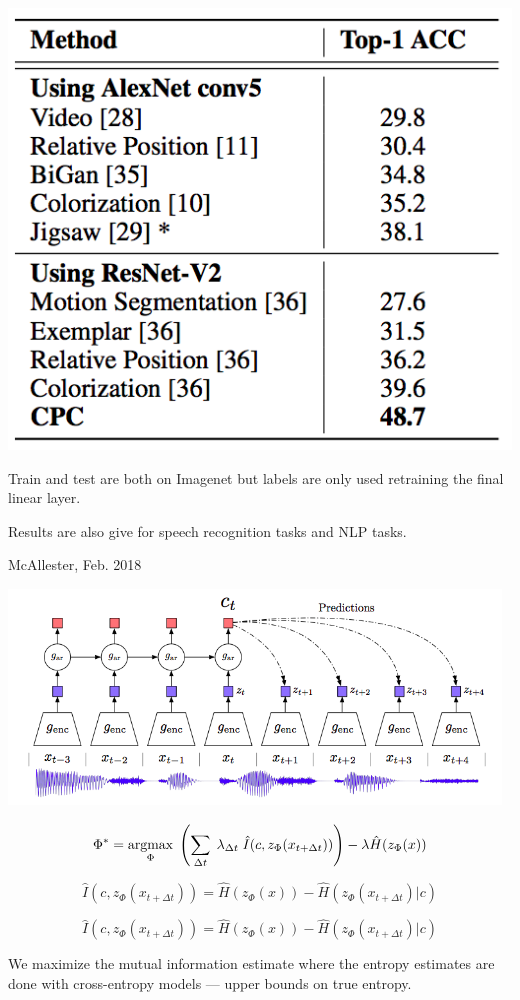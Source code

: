 {\centerline{\includegraphics[height=3.5 in]{../images/LearnRepCTCc}}

Train and test are both on Imagenet but labels are only used retraining the final linear layer.

\vfill
Results are also give for speech recognition tasks and NLP tasks.


{McAllester, Feb. 2018}

\centerline{\includegraphics[height=2.25in]{../images/MMI-PC}}

$$\Phi^* = \operatorname*{argmax}_\Phi\;\left(\sum_{\Delta t} \;\lambda_{\Delta t}\; \hat{I}(c,z_\Phi(x_{t+\Delta t}))\right) - \lambda \hat{H}(z_\Phi(x))$$

\vfill
$$\hat{I}(c,z_\Phi(x_{t+ \Delta t})) = \hat{H}(z_\Phi(x)) - \hat{H}(z_\Phi(x_{t+\Delta t})|c)$$


$$\hat{I}(c,z_\Phi(x_{t+ \Delta t})) = \hat{H}(z_\Phi(x)) - \hat{H}(z_\Phi(x_{t+\Delta t})|c)$$

We maximize the mutual information estimate where the entropy estimates are done with cross-entropy models --- upper bounds on true entropy.

}
